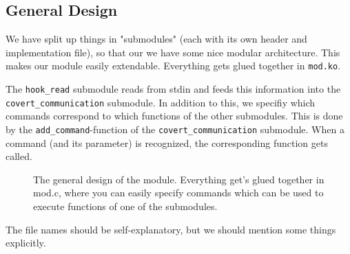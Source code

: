 \documentclass[10pt, letterpaper]{scrartcl}
\begin{document}
\subsection{General Design}

We have split up things in "submodules" (each with its own header and implementation file), so
that our we have some nice modular architecture. This makes our module easily extendable. Everything gets glued together in \texttt{mod.ko}.

The \texttt{hook\_read} submodule reads from stdin and feeds this information into the \linebreak \texttt{covert\_communication} submodule. In addition to this, we specifiy which commands correspond to which functions of the other submodules. This is done by the \texttt{add\_command}-function of the  \texttt{covert\_communication} submodule. When a command (and its parameter) is recognized, the corresponding function gets called.

 \begin{figure}[ht]
  \centering
  
  \caption{The general design of the module. Everything get's glued together in mod.c, where you can easily specify commands which can be used to execute functions of one of the submodules.}
  \label{fig:module-decomposition}
\end{figure}
The file names should be self-explanatory, but we should mention some things explicitly.
\end{document}
